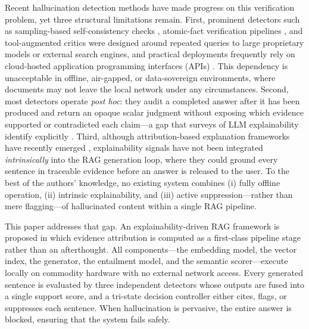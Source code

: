 \documentclass[journal]{IEEEtran}
\begin{document}
Recent hallucination detection methods have made progress on this
verification problem, yet three structural limitations remain. First,
prominent detectors such as sampling-based self-consistency checks
\cite{manakul2023selfcheckgpt,farquhar2024semantic}, atomic-fact
verification pipelines \cite{min2023factscore,wei2024longform}, and
tool-augmented critics \cite{pan2023factool,gou2024critic} were designed
around repeated queries to large proprietary models or external search
engines, and practical deployments frequently rely on cloud-hosted
application programming interfaces (APIs) \cite{es2024ragas,liu2023geval}.
This dependency is unacceptable in offline, air-gapped, or data-sovereign
environments, where documents may not leave the local network under any
circumstances. Second, most detectors operate \emph{post hoc}: they audit a
completed answer after it has been produced and return an opaque scalar
judgment without exposing which evidence supported or contradicted each
claim---a gap that surveys of LLM explainability identify explicitly
\cite{minaee2024xai,rahman2026survey}. Third, although attribution-based
explanation frameworks have recently emerged
\cite{zhang2024feel,agrawal2024attributed}, explainability signals have not
been integrated \emph{intrinsically} into the RAG generation loop, where
they could ground every sentence in traceable evidence before an answer is
released to the user. To the best of the authors' knowledge, no existing
system combines (i) fully offline operation, (ii) intrinsic explainability,
and (iii) active suppression---rather than mere flagging---of hallucinated
content within a single RAG pipeline.

This paper addresses that gap. An explainability-driven RAG framework is
proposed in which evidence attribution is computed as a first-class pipeline
stage rather than an afterthought. All components---the embedding model, the
vector index, the generator, the entailment model, and the semantic
scorer---execute locally on commodity hardware with no external network
access. Every generated sentence is evaluated by three independent detectors
whose outputs are fused into a single support score, and a tri-state
decision controller either cites, flags, or suppresses each sentence. When
hallucination is pervasive, the entire answer is blocked, ensuring that the
system fails safely.
\end{document}
